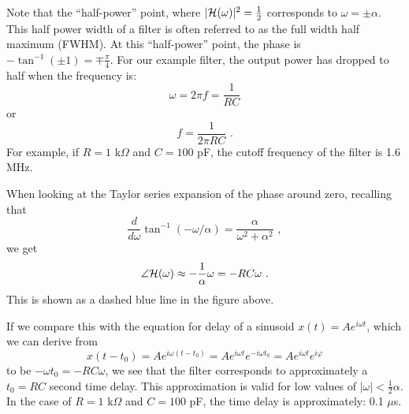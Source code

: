 Note that the ``half-power'' point, where $|\mathcal{H}(\omega)|^2=\frac{1}{2}$
corresponds to $\omega = \pm \alpha$. This half power width of a
filter is often referred to as the full width half maximum (FWHM). At
this ``half-power'' point, the phase is $- \tan^{-1}(\pm 1)
= \mp \frac{\pi}{4}$. For our example filter, the output power has
dropped to half when the frequency is:
\begin{equation}
\omega = 2\pi f = \frac{1}{RC}
\end{equation}
or 
\begin{equation}
f = \frac{1}{2\pi RC}\,\,.
\end{equation}
For example, if $R=1$ k$\Omega$ and $C=100$ pF, the cutoff frequency
of the filter is 1.6 MHz.

When looking at the Taylor series expansion of the phase around zero,
recalling that
\begin{equation}
\frac{d}{d\omega}\tan^{-1}(-\omega/\alpha) = \frac{\alpha}{\omega^2 + \alpha^2}\,\,,
\end{equation}
we get
\begin{equation}
\angle\mathcal{H}(\omega) \approx -\frac{1}{\alpha}\omega = -RC \omega\,\,.
\end{equation}
This is shown as a dashed blue line in the figure above. 

If we compare this with the equation for delay of a sinusoid
$x(t)=Ae^{i\omega t}$, which we can derive from
\begin{equation}
x(t-t_0) = Ae^{i\omega(t-t_0)} = Ae^{i\omega t} e^{-i\omega t_0} = Ae^{i\omega t} e^{i\varphi} 
\end{equation}
to be $-\omega t_0 = -RC\omega$, we see that the filter corresponds to
approximately a $t_0 = RC$ second time delay. This approximation is
valid for low values of $|\omega| < \frac{1}{2}\alpha$. In the case of
$R=1$ k$\Omega$ and $C=100$ pF, the time delay is approximately: 0.1
$\mu$s.



